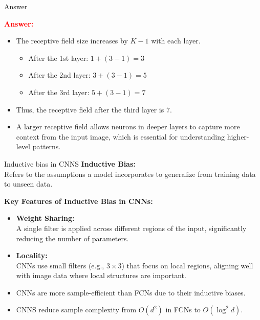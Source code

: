 \documentclass[default, aspectratio=169]{beamer}
\begin{document}
	\begin{frame}{Answer}
			\item \textbf{\textcolor{red}{Answer:}}
			\begin{itemize}
				\item The receptive field size increases by \( K - 1 \) with each layer.
				\begin{itemize}
					\item After the 1st layer: \( 1 + (3 - 1) = 3 \)
					\item After the 2nd layer: \( 3 + (3 - 1) = 5 \)
					\item After the 3rd layer: \( 5 + (3 - 1) = 7 \)
				\end{itemize}
				\item Thus, the receptive field after the third layer is \( 7 \).
				\item A larger receptive field allows neurons in deeper layers to capture more context from the input image, which is essential for understanding higher-level patterns.
			\end{itemize}
	\end{frame}
	

	\begin{frame}{Inductive bias in CNNS}
		\textbf{Inductive Bias:} \\
		Refers to the assumptions a model incorporates to generalize from training data to unseen data.
		
		\bigskip
		\textbf{Key Features of Inductive Bias in CNNs:}
		\begin{itemize}
			\item \textbf{Weight Sharing:} \\
			A single filter is applied across different regions of the input, significantly reducing the number of parameters.
			
			\item \textbf{Locality:} \\
			CNNs use small filters (e.g., $3 \times 3$) that focus on local regions, aligning well with image data where local structures are important.
			
			\item CNNs are more sample-efficient than FCNs due to their inductive biases.
			\item CNNS reduce sample complexity from $O(d^2)$ in FCNs to $O(\log^2 d)$.
		\end{itemize}
	\end{frame}
	
	
\end{document}
